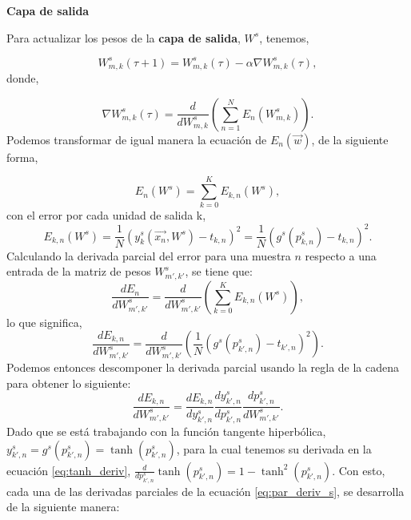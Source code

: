 \documentclass{article}
\begin{document}
\noindent
\textbf{Capa de salida}
\medskip

Para actualizar los pesos de la\textbf{ capa de salida}, $W^s$, tenemos,

\begin{equation}
    W_{m,k}^s(\tau + 1) = W_{m,k}^s(\tau) - \alpha \nabla W_{m,k}^s(\tau), \label{eq:graddesc_s}
\end{equation}
\noindent
donde, 

\begin{equation}
    \nabla W^s_{m,k}(\tau) = \frac{d}{dW^s_{m,k}}\left(\sum_{n=1}^{N}{E_n(W_{m,k}^s)}\right).
\end{equation}
\noindent
Podemos transformar de igual manera la ecuación de $E_n(\vec{w})$, de la siguiente forma,

\begin{equation*}
    E_n(W^s) = \sum_{k=0}^{K}{E_{k,n}(W^s)},
\end{equation*}
\noindent
con el error por cada unidad de salida k,
\begin{equation*}
    E_{k,n}(W^s) = \frac{1}{N}\left(y_k^s(\vec{x_n}, W^s) - t_{k,n}\right)^2 = \frac{1}{N}\left(g^s(p_{k,n}^s) - t_{k,n}\right)^2.
\end{equation*}
\noindent
Calculando la derivada parcial del error para una muestra $n$ respecto a una entrada de la matriz de pesos $W_{m',k'}^s$, se tiene que:
\begin{equation*}
    \frac{dE_n}{dW_{m',k'}^s} = \frac{d}{dW_{m',k'}^s}\left( \sum_{k=0}^{K}{E_{k,n}(W^s)}\right),
\end{equation*}
\noindent
lo que significa,
\begin{equation}
    \frac{dE_{k,n}}{dW_{m',k'}^s} = \frac{d}{dW_{m',k'}^s}\left( \frac{1}{N}\left(g^s(p_{k',n}^s) - t_{k',n}\right)^2 \right).
\end{equation}
\noindent
Podemos entonces descomponer la derivada parcial usando la regla de la cadena para obtener lo siguiente:
\begin{equation}
    \frac{dE_{k,n}}{dW_{m',k'}^s} = \frac{dE_{k,n}}{dy_{k',n}^s} \frac{dy_{k',n}^s}{dp_{k',n}^s} \frac{dp_{k',n}^s}{dW_{m',k'}^s}. \label{eq:par_deriv_s}
\end{equation}
\noindent
Dado que se está trabajando con la función tangente hiperbólica, $y_{k',n}^s = g^s(p_{k',n}^s) = \tanh(p_{k',n}^s)$, para la cual tenemos su derivada en la ecuación \ref{eq:tanh_deriv}, $\frac{d}{dp_{k',n}^s}\tanh(p_{k',n}^s) = 1 - \tanh^2(p_{k',n}^s)$. Con esto, cada una de las derivadas parciales de la ecuación \ref{eq:par_deriv_s}, se desarrolla de la siguiente manera:
\end{document}
